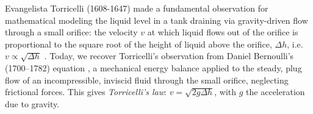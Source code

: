 \documentclass[openacc]{rsproca_new}%
\begin{document}

Evangelista Torricelli (1608-1647) made a fundamental observation for mathematical modeling the liquid level in a tank draining via gravity-driven flow through a small orifice: the velocity $v$ at which liquid flows out of the orifice is proportional to the square root of the height of liquid above the orifice, $\Delta h$, i.e. $v\propto \sqrt{\Delta h}$ \cite{mills1982newton}.
Today, we recover Torricelli's observation from Daniel Bernoulli's (1700–1782) equation \cite{welty2020fundamentals}, a mechanical energy balance applied to the steady, plug flow of an incompressible, inviscid fluid through the small orifice, neglecting frictional forces. This gives \emph{Torricelli's law}: $v=\sqrt{2 g \Delta h}$, with $g$ the acceleration due to gravity. \cite{d2021torricelli,teoman2022discharge}
\end{document}
